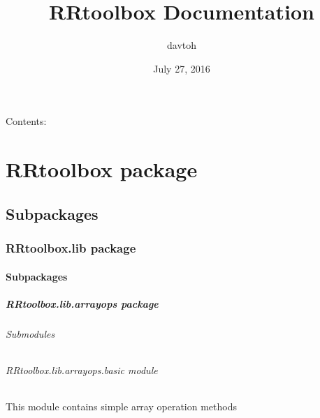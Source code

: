 \documentclass[letterpaper,10pt,english]{sphinxmanual}
\title{RRtoolbox Documentation}
\date{July 27, 2016}
\author{davtoh}
\begin{document}
\maketitle
\tableofcontents
{}\label{index::doc}


Contents:


\chapter{RRtoolbox package}
\label{RRtoolbox::doc}\label{RRtoolbox:welcome-to-rrtoolbox-s-documentation}\label{RRtoolbox:rrtoolbox-package}

\section{Subpackages}
\label{RRtoolbox:subpackages}

\subsection{RRtoolbox.lib package}
\label{RRtoolbox.lib:rrtoolbox-lib-package}\label{RRtoolbox.lib::doc}

\subsubsection{Subpackages}
\label{RRtoolbox.lib:subpackages}

\paragraph{RRtoolbox.lib.arrayops package}
\label{RRtoolbox.lib.arrayops:rrtoolbox-lib-arrayops-package}\label{RRtoolbox.lib.arrayops::doc}

\subparagraph{Submodules}
\label{RRtoolbox.lib.arrayops:submodules}

\subparagraph{RRtoolbox.lib.arrayops.basic module}
\label{RRtoolbox.lib.arrayops:rrtoolbox-lib-arrayops-basic-module}\label{RRtoolbox.lib.arrayops:module-RRtoolbox.lib.arrayops.basic}
This module contains simple array operation methods
\end{document}
